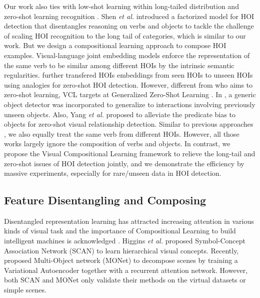 \documentclass[runningheads]{llncs}
\newcommand{\etal}{\textit{et al.}}
\begin{document}
Our work also ties with low-shot learning \cite{wang2018low} within long-tailed distribution \cite{liu2019large} and zero-shot learning recognition \cite{xian2017zero}.
Shen \etal \cite{shen2018scaling} introduced a factorized model for HOI detection that disentangles reasoning on verbs and objects to tackle the challenge of scaling HOI recognition to the long tail of categories, which is similar to our work. But we design a compositional learning approach to compose HOI examples. Visual-language joint embedding models \cite{xu2019learning, Peyre_2019_ICCV} enforce the representation of the same verb to be similar among different HOIs by the intrinsic semantic regularities. \cite{Peyre_2019_ICCV} further transfered HOIs embeddings from seen HOIs to unseen HOIs using analogies for zero-shot HOI detection. However, different from \cite{Peyre_2019_ICCV} who aims to zero-shot learning, VCL targets at Generalized Zero-Shot Learning \cite{xian2018zero}. In \cite{bansal2019detecting}, a generic object detector was incorporated to generalize to interactions involving previously unseen objects. Also, Yang \etal \cite{yang2018shuffle} proposed to alleviate the predicate bias to objects for zero-shot visual relationship detection. Similar to previous approaches \cite{shen2018scaling, xu2019learning, bansal2019detecting, Peyre_2019_ICCV}, we also equally treat the same verb from different HOIs. However, all those works \cite{shen2018scaling, xu2019learning, bansal2019detecting, Peyre_2019_ICCV} largely ignore the composition of verbs and objects. In contrast, we propose the Visual Compositional Learning framework to relieve the long-tail and zero-shot issues of HOI detection jointly,
and we demonstrate the efficiency by massive experiments, especially for rare/unseen data in HOI detection.


\subsection{Feature Disentangling and Composing}

Disentangled representation learning has attracted increasing attention in various kinds of visual task \cite{bengio2013representation, higgins2017beta,
locatello2018challenging, higgins2017scan, burgess2019monet}
and the importance of Compositional Learning to build intelligent machines is acknowledged \cite{bengio2013representation, lake2017building, garnelo2019reconciling, battaglia2018relational}.
Higgins \etal \cite{higgins2017scan} proposed Symbol-Concept Association Network (SCAN) to learn  hierarchical visual concepts.
Recently, \cite{burgess2019monet} proposed Multi-Object network (MONet) to decompose scenes by training a Variational Autoencoder together with a recurrent attention network. However, both SCAN \cite{higgins2017scan} and MONet \cite{burgess2019monet} only validate their methods on the virtual datasets or simple scenes.
\end{document}
